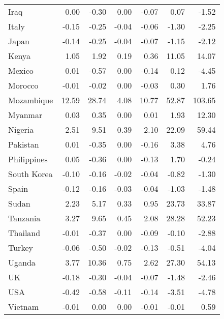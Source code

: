 \begin{table}[b]
\begin{tabular}[t]{lrrrrrr}
Iraq & 0.00 & -0.30 & 0.00 & -0.07 & 0.07 & -1.52\\
Italy & -0.15 & -0.25 & -0.04 & -0.06 & -1.30 & -2.25\\
Japan & -0.14 & -0.25 & -0.04 & -0.07 & -1.15 & -2.12\\
Kenya & 1.05 & 1.92 & 0.19 & 0.36 & 11.05 & 14.07\\
Mexico & 0.01 & -0.57 & 0.00 & -0.14 & 0.12 & -4.45\\
Morocco & -0.01 & -0.02 & 0.00 & -0.03 & 0.30 & 1.76\\
Mozambique & 12.59 & 28.74 & 4.08 & 10.77 & 52.87 & 103.65\\
Myanmar & 0.03 & 0.35 & 0.00 & 0.01 & 1.93 & 12.30\\
Nigeria & 2.51 & 9.51 & 0.39 & 2.10 & 22.09 & 59.44\\
Pakistan & 0.01 & -0.35 & 0.00 & -0.16 & 3.38 & 4.76\\
Philippines & 0.05 & -0.36 & 0.00 & -0.13 & 1.70 & -0.24\\
South Korea & -0.10 & -0.16 & -0.02 & -0.04 & -0.82 & -1.30\\
Spain & -0.12 & -0.16 & -0.03 & -0.04 & -1.03 & -1.48\\
Sudan & 2.23 & 5.17 & 0.33 & 0.95 & 23.73 & 33.87\\
Tanzania & 3.27 & 9.65 & 0.45 & 2.08 & 28.28 & 52.23\\
Thailand & -0.01 & -0.37 & 0.00 & -0.09 & -0.10 & -2.88\\
Turkey & -0.06 & -0.50 & -0.02 & -0.13 & -0.51 & -4.04\\
Uganda & 3.77 & 10.36 & 0.75 & 2.62 & 27.30 & 54.13\\
UK & -0.18 & -0.30 & -0.04 & -0.07 & -1.48 & -2.46\\
USA & -0.42 & -0.58 & -0.11 & -0.14 & -3.51 & -4.78\\
Vietnam & -0.01 & 0.00 & 0.00 & -0.01 & -0.01 & 0.59\\
\bottomrule
\end{tabular}
\end{table}